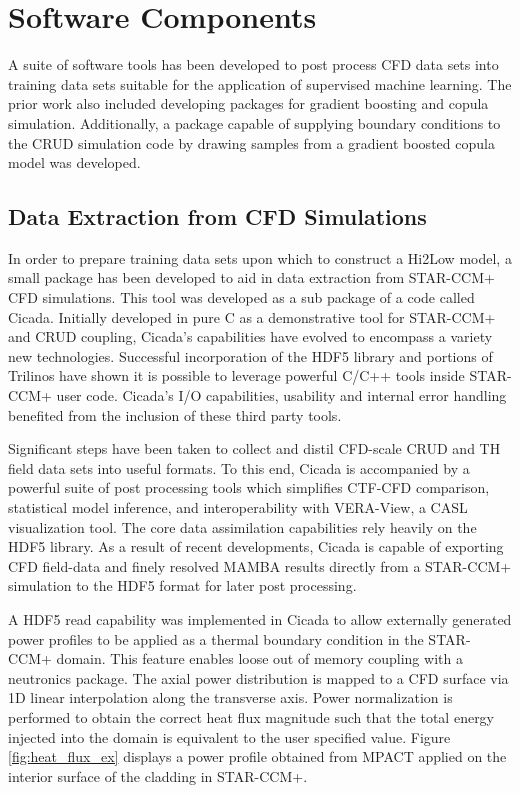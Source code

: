 \section{Software Components}

A suite of software tools has been developed to post process CFD data sets into training data sets suitable for the application of supervised machine learning.   The prior work also included developing packages for gradient boosting and copula simulation.  Additionally, a package capable of supplying boundary conditions to the CRUD simulation code by drawing samples from a gradient boosted copula model was developed.

\subsection{Data Extraction from CFD Simulations}

In order to prepare training data sets upon which to construct a Hi2Low model, a small package has been developed to aid in data extraction from STAR-CCM+ CFD simulations.  This tool was developed as a sub package of a code called Cicada. Initially developed in pure C as a demonstrative tool for STAR-CCM+ and CRUD coupling, Cicada's capabilities have evolved to encompass a variety new technologies.  Successful incorporation of the HDF5 library and portions of Trilinos have shown it is possible to leverage powerful C/C++ tools inside STAR-CCM+ user code.  Cicada's I/O capabilities, usability and internal error handling benefited from the inclusion of these third party tools.

Significant steps have been taken to collect and distil CFD-scale CRUD and TH field data sets into useful formats.  To this end, Cicada is accompanied by a powerful suite of post processing tools which simplifies CTF-CFD comparison, statistical model inference, and interoperability with VERA-View, a CASL visualization tool. The core data assimilation capabilities rely heavily on the HDF5 library.  As a result of recent developments, Cicada is capable of exporting CFD field-data and finely resolved MAMBA results directly from a STAR-CCM+ simulation to the HDF5 format for later post processing.  

A HDF5 read capability was implemented in Cicada to allow externally generated power profiles to be applied as a thermal boundary condition in the STAR-CCM+ domain.  This feature enables loose out of memory coupling with a neutronics package. 
The axial power distribution is mapped to a CFD surface via 1D linear interpolation along the transverse axis.  Power normalization is performed to obtain the correct heat flux magnitude such that the total energy injected into the domain is equivalent to the user specified value.   Figure \ref{fig:heat_flux_ex} displays a power profile obtained from MPACT applied on the interior surface of the cladding in STAR-CCM+.

